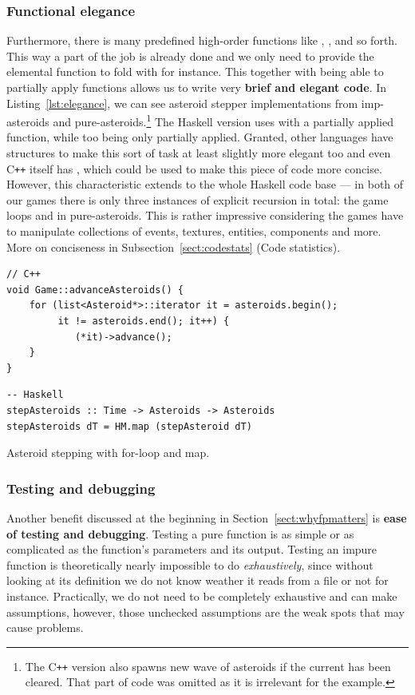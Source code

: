 \documentclass[
  digital, %
  color,   %
  table,   %
  oneside, %
  lof,     %
  lot,     %
]{fithesis3}
\newcommand{\cpp}{C\nolinebreak\texttt{+}\nolinebreak\texttt{+}}
\begin{document}
{\subsubsection{Functional elegance}
Furthermore, there is many predefined high-order functions like
, ,  and so forth. This way a part of the
job is already done and we only need to provide the elemental function to fold with for instance.
This together with being able to partially apply functions allows us to write
very \textbf{brief and elegant code}. In Listing~\ref{lst:elegance},
we can see asteroid stepper implementations
from imp-asteroids and pure-asteroids.\footnote{
The \cpp{} version also spawns new wave of asteroids if the current has been cleared.
That part of code was omitted as it is irrelevant for the example.
} The Haskell version uses  with a partially applied function,
while too being only partially applied. Granted, other languages have structures
to make this sort of task at least slightly more elegant too
and even \cpp{} itself has ,
which could be used to make this piece of code more concise. However, this characteristic extends
to the whole Haskell code base --- in both of our games there is only three instances
of explicit recursion in total: the game loops and  in pure-asteroids.
This is rather impressive considering the games have to manipulate collections of events,
textures, entities, components and more.
More on conciseness in Subsection~\ref{sect:codestats} (Code statistics).
\begin{listing}[H]
\begin{verbatim}
// C++
void Game::advanceAsteroids() {
    for (list<Asteroid*>::iterator it = asteroids.begin();
         it != asteroids.end(); it++) {
            (*it)->advance();
    }
}
\end{verbatim}

\begin{verbatim}
-- Haskell
stepAsteroids :: Time -> Asteroids -> Asteroids
stepAsteroids dT = HM.map (stepAsteroid dT)
\end{verbatim}

\caption{Asteroid stepping with for-loop and map.}
\label{lst:elegance}
\end{listing}

\subsubsection{Testing and debugging}
Another benefit discussed at the beginning in Section~\ref{sect:whyfpmatters}
is \textbf{ease of testing and debugging}. Testing a pure function is as simple or as complicated
as the function's parameters and its output. Testing an impure function is
theoretically nearly impossible to do \emph{exhaustively}, since without looking at
its definition we do not know weather it reads from a file or not for instance.
Practically, we do not need to be completely exhaustive and can make assumptions,
however, those unchecked assumptions are the weak spots that may cause problems.

}
\end{document}
